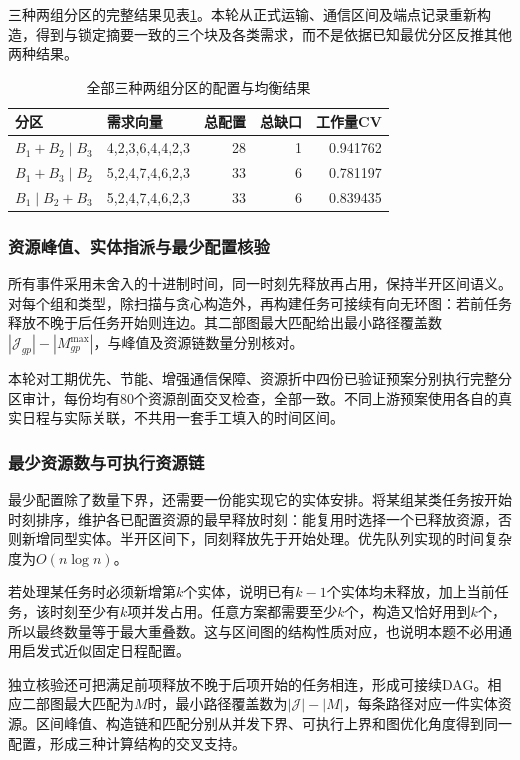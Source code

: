 \documentclass[withoutpreface,colorprint]{format}
\numberwithin{equation}{section}
\numberwithin{figure}{section}
\numberwithin{table}{section}
\begin{document}
三种两组分区的完整结果见表\ref{tab:q4_partitions}。本轮从正式运输、通信区间及端点记录重新构造，得到与锁定摘要一致的三个块及各类需求，而不是依据已知最优分区反推其他两种结果。

\begin{table}[htbp]\centering\small
\caption{全部三种两组分区的配置与均衡结果}\label{tab:q4_partitions}
\begin{tabular}{@{}llrrr@{}}
\toprule
分区 & 需求向量 & 总配置 & 总缺口 & 工作量CV\\
\midrule
$B_1+B_2\mid B_3$ & 4,2,3,6,4,4,2,3 & 28 & 1 & 0.941762\\
$B_1+B_3\mid B_2$ & 5,2,4,7,4,6,2,3 & 33 & 6 & 0.781197\\
$B_1\mid B_2+B_3$ & 5,2,4,7,4,6,2,3 & 33 & 6 & 0.839435\\
\bottomrule
\end{tabular}
\end{table}


\subsubsection{资源峰值、实体指派与最少配置核验}
所有事件采用未舍入的十进制时间，同一时刻先释放再占用，保持半开区间语义。对每个组和类型，除扫描与贪心构造外，再构建任务可接续有向无环图：若前任务释放不晚于后任务开始则连边。其二部图最大匹配给出最小路径覆盖数$|\mathcal J_{gp}|-|M_{gp}^{\max}|$，与峰值及资源链数量分别核对。

本轮对工期优先、节能、增强通信保障、资源折中四份已验证预案分别执行完整分区审计，每份均有80个资源剖面交叉检查，全部一致。不同上游预案使用各自的真实日程与实际关联，不共用一套手工填入的时间区间。


\subsubsection{最少资源数与可执行资源链}
最少配置除了数量下界，还需要一份能实现它的实体安排。将某组某类任务按开始时刻排序，维护各已配置资源的最早释放时刻：能复用时选择一个已释放资源，否则新增同型实体。半开区间下，同刻释放先于开始处理。优先队列实现的时间复杂度为$O(n\log n)$。

若处理某任务时必须新增第$k$个实体，说明已有$k-1$个实体均未释放，加上当前任务，该时刻至少有$k$项并发占用。任意方案都需要至少$k$个，构造又恰好用到$k$个，所以最终数量等于最大重叠数。这与区间图的结构性质对应\cite{fulkerson1965interval}，也说明本题不必用通用启发式近似固定日程配置。

独立核验还可把满足前项释放不晚于后项开始的任务相连，形成可接续DAG。相应二部图最大匹配为$M$时，最小路径覆盖数为$|\mathcal J|-|M|$，每条路径对应一件实体资源。区间峰值、构造链和匹配分别从并发下界、可执行上界和图优化角度得到同一配置，形成三种计算结构的交叉支持。
\end{document}
